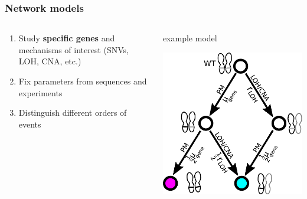 \documentclass{beamer}
\begin{document}
\begin{frame}
\end{frame}

%

\begin{frame}
    \frametitle{Network models}
    \begin{columns}
        \begin{column}{0.5\textwidth}
        \begin{enumerate}
            \item Study \textbf{specific genes} and mechanisms of interest
            (SNVs, LOH, CNA, etc.)
            \item Fix parameters from sequences and experiments
            \item Distinguish different orders of events
        \end{enumerate}
        \end{column}
        \begin{column}{0.5\textwidth}
        \begin{center}
            \small{example model}
        \end{center}
            \includegraphics[width=\textwidth]{figures/diagram4}
        \end{column}
    \end{columns}


\end{frame}
\end{document}

